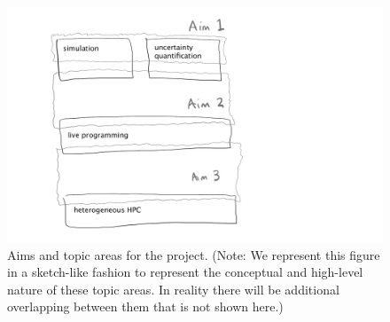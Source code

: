  
 
 
\begin{figure}
  \begin{center}
    \includegraphics[scale=0.17]{figures/aims-figure.png}%
    \caption{Aims and topic areas for the project. (Note: We represent this figure in a sketch-like fashion to represent the conceptual and high-level nature of these topic areas. In reality there will be additional overlapping between them that is not shown here.)}\label{projectFig}
  \end{center}
\end{figure}

